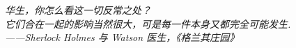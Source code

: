 \begin{flushright}\itshape
华生，你怎么看这一切反常之处？\\
它们合在一起的影响当然很大，可是每一件本身又都完全可能发生.\\
——Sherlock Holmes 与 Watson 医生，《格兰其庄园》
\end{flushright}

